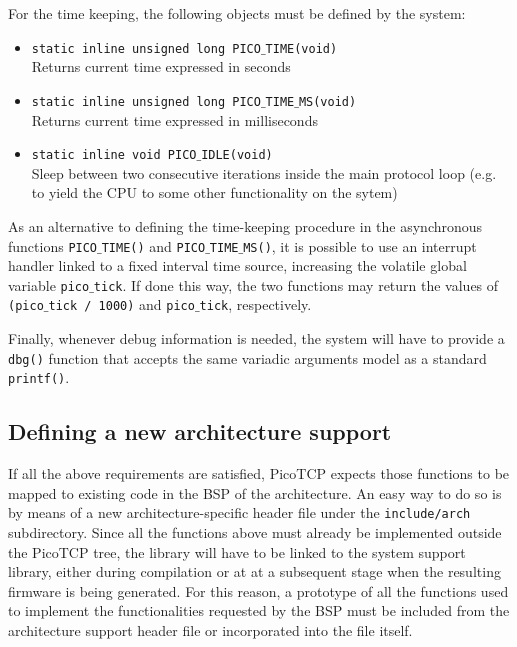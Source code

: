 For the time keeping, the following objects must be defined by the system:
\begin{itemize}%
\item
\texttt{static inline unsigned long PICO$\_$TIME(void)}\\
Returns current time expressed in seconds

\item
\texttt{static inline unsigned long PICO$\_$TIME$\_$MS(void)}\\
Returns current time expressed in milliseconds

\item
\texttt{static inline void PICO$\_$IDLE(void)}\\
Sleep between two consecutive iterations inside the main protocol loop
(e.g. to yield the CPU to some other functionality on the sytem)
\end{itemize}

As an alternative to defining the time-keeping procedure in the asynchronous
functions \texttt{PICO$\_$TIME()} and \texttt{PICO$\_$TIME$\_$MS()}, it is possible
to use an interrupt handler linked to a fixed interval time source, increasing the
volatile global variable \texttt{pico$\_$tick}. If done this way, the two
functions may return the values of \texttt{(pico$\_$tick / 1000)} and
\texttt{pico$\_$tick}, respectively.

Finally, whenever debug information is needed, the system will have to provide a
\texttt{dbg()} function that accepts the same variadic arguments model as a standard \texttt{printf()}.


\subsection{Defining a new architecture support}
If all the above requirements are satisfied, PicoTCP expects those
functions to be mapped to existing code in the BSP of the architecture.
An easy way to do so is by means of a new architecture-specific header
file under the \texttt{include/arch} subdirectory.
Since all the functions above must already be implemented outside the
PicoTCP tree, the library will have to be linked to the system support
library, either during compilation or at at a subsequent stage when the resulting
firmware is being generated. For this reason, a prototype of all the
functions used to implement the functionalities requested by the BSP
must be included from the architecture support header file or incorporated
into the file itself.

